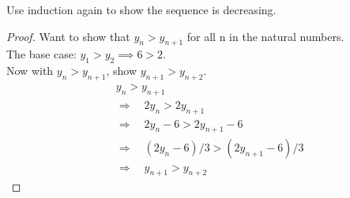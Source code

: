 \documentclass{article}
\begin{document}
Use induction again to show the sequence is decreasing.
\begin{proof}
    Want to show that $y_n > y_{n+1}$ for all n in the natural numbers. \\
    The base case: $y_1 > y_{2} \implies 6 > 2$. \\
    Now with $y_n > y_{n+1}$, show $y_{n+1} > y_{n+2}$.
    \begin{align*}
        & y_n > y_{n+1} \\
        &\Rightarrow\quad 2y_n > 2y_{n+1} \\
        &\Rightarrow\quad2y_n -6 > 2y_{n+1} - 6 \\
        &\Rightarrow\quad (2y_n - 6) /3 > (2y_{n+1} - 6)/3 \\
        &\Rightarrow\quad y_{n+1} > y_{n+2}
    \end{align*}
\end{proof}
\end{document}
